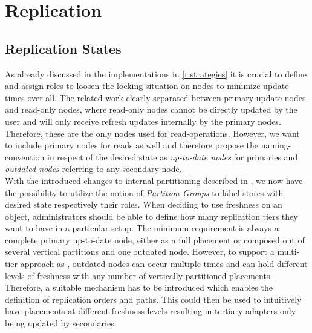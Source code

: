 
\section{Replication}
\label{sec:replication}

\subsection{Replication States}
\label{sec:state}

As already discussed in the implementations in \ref{r:strategies} it is crucial to define and assign roles to loosen the locking situation on nodes
to minimize update times over all. The related work clearly separated between primary-update nodes and read-only nodes, where 
read-only nodes cannot be directly updated by the user and will only receive refresh updates internally by the primary nodes.
Therefore, these are the only nodes used for read-operations. 
However, we want to include primary nodes for reads as well and therefore propose the naming-convention in respect of the desired state as \emph{up-to-date nodes} for primaries
and \emph{outdated-nodes} referring to any secondary node. \\
With the introduced changes to internal partitioning described in \cite{hennemann_2021}, we now have the possibility to utilize the notion of \emph{Partition Groups}
to label stores with desired state respectively their roles.  
When deciding to use freshness on an object, administrators should be able to define how many replication tiers they want to have in a particular setup.
The minimum requirement is always a complete primary up-to-date node, either as a full placement or composed out of several vertical partitions and one outdated node.  
However, to support a multi-tier approach as \cite{voicu:2010}, outdated nodes can occur multiple times and can hold different levels of freshness with any number of vertically partitioned
placements. Therefore, a suitable mechanism has to be introduced which enables the definition of replication orders and paths. This could then be used to 
intuitively have placements at different freshness levels resulting in tertiary adapters only being updated by secondaries.\\




